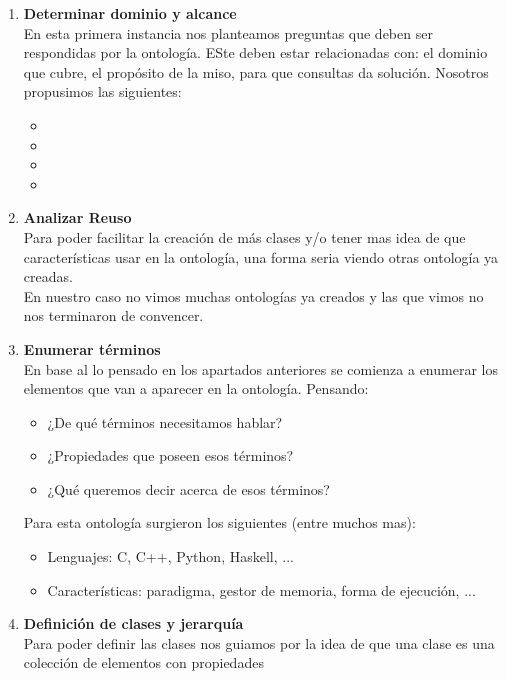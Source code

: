 \documentclass[12pt, titlepage, a4paper]{article}
\begin{document}
\begin{enumerate}
    \item {\textbf{Determinar dominio y alcance}\\
           En esta primera instancia nos planteamos preguntas que deben 
           ser respondidas por la ontología. ESte deben estar relacionadas 
           con: el dominio que cubre, el propósito de la miso, para que 
           consultas da solución. Nosotros propusimos las siguientes:
           \begin{itemize}
                \item {}
                \item {}
                \item {} 
                \item {}
           \end{itemize}}
    \item {\textbf{Analizar Reuso}\\
           Para poder facilitar la creación de más clases y/o tener mas 
           idea de que características usar en la ontología, una 
           forma seria viendo otras ontología ya creadas. \\

           En nuestro caso no vimos muchas ontologías ya creados y las 
           que vimos no nos terminaron de convencer.
           }
    \item {\textbf{Enumerar términos}\\
           En base al lo pensado en los apartados anteriores se comienza a 
           enumerar los elementos que van a aparecer en la ontología.
           Pensando:
           \begin{itemize}
            \item {¿De qué términos necesitamos hablar?}
            \item {¿Propiedades que poseen esos términos?}
            \item {¿Qué queremos decir acerca de esos términos?} 
           \end{itemize}
           Para esta ontología surgieron los siguientes (entre muchos mas):
           \begin{itemize}
            \item {Lenguajes: C, C++, Python, Haskell, ...}
            \item {Características: paradigma, gestor de memoria, forma de ejecución, ...}
           \end{itemize}}
    \item {\textbf{Definición de clases y jerarquía}\\
           Para poder definir las clases nos guiamos por la idea de que 
           una clase es una colección de elementos con propiedades 

}
\end{enumerate}
\end{document}
